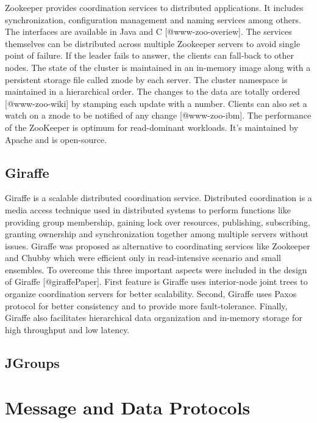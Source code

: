 Zookeeper provides coordination services to distributed applications.
It includes synchronization, configuration management and naming
services among others. The interfaces are available in Java and
C [@www-zoo-overiew]. The services themselves can be distributed
across multiple Zookeeper servers to avoid single point of failure.
If the leader fails to answer, the clients can fall-back to other
nodes. The state of the cluster is maintained in an in-memory image
along with a persistent storage file called znode by each server. The
cluster namespace is maintained in a hierarchical order. The changes
to the data are totally ordered [@www-zoo-wiki] by stamping each
update with a number. Clients can also set a watch on a znode to be
notified of any change [@www-zoo-ibm]. The performance of the
ZooKeeper is optimum for read-dominant workloads. It's maintained by
Apache and is open-source.

\subsection{Giraffe}

Giraffe is a scalable distributed coordination service. Distributed
coordination is a media access technique used in distributed systems
to perform functions like providing group membership, gaining lock
over resources, publishing, subscribing, granting ownership and
synchronization together among multiple servers without
issues. Giraffe was proposed as alternative to coordinating services
like Zookeeper and Chubby which were efficient only in read-intensive
scenario and small ensembles. To overcome this three important aspects
were included in the design of Giraffe [@giraffePaper]. First
feature is Giraffe uses interior-node joint trees to organize
coordination servers for better scalability. Second, Giraffe uses
Paxos protocol for better consistency and to provide more
fault-tolerance. Finally, Giraffe also facilitates hierarchical data
organization and in-memory storage for high throughput and low
latency.
     
\subsection{JGroups}

\section{Message and Data Protocols}

